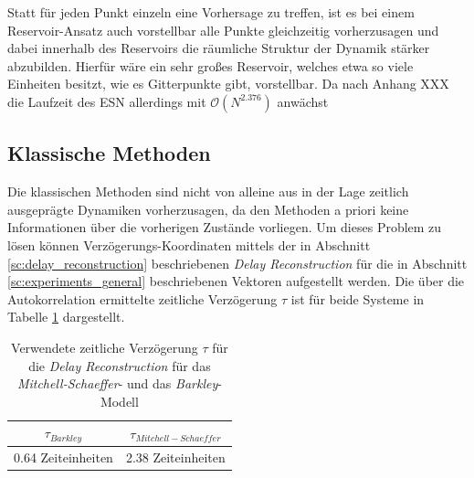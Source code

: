 Statt für jeden Punkt einzeln eine Vorhersage zu treffen, ist es bei einem Reservoir-Ansatz auch vorstellbar alle Punkte gleichzeitig vorherzusagen und dabei innerhalb des Reservoirs die räumliche Struktur der Dynamik stärker abzubilden. Hierfür wäre ein sehr großes Reservoir, welches etwa so viele Einheiten besitzt, wie es Gitterpunkte gibt, vorstellbar. Da nach Anhang XXX die Laufzeit des \textsc{ESN} allerdings mit $\mathcal{O}(N^{2.376})$ anwächst

\FloatBarrier
\subsection{Klassische Methoden}
Die klassischen Methoden sind nicht von alleine aus in der Lage zeitlich ausgeprägte Dynamiken vorherzusagen, da den Methoden a priori keine Informationen über die vorherigen Zustände vorliegen. Um dieses Problem zu lösen können Verzögerungs-Koordinaten mittels der in Abschnitt \ref{sc:delay_reconstruction} beschriebenen \textit{Delay Reconstruction} für die in Abschnitt \ref{sc:experiments_general} beschriebenen Vektoren aufgestellt werden. Die über die Autokorrelation ermittelte zeitliche Verzögerung $\tau$ ist für beide Systeme in Tabelle \ref{tab:delay_reconstruction_tau} dargestellt.     

\begin{table}[h]
\centering
\begin{tabular}{|c|c|}
$\tau_{Barkley}$ & $\tau_{Mitchell-Schaeffer}$ \\ 
\hline 
\hline 
0.64 Zeiteinheiten & 2.38 Zeiteinheiten\\ 
\hline 
\end{tabular} 
\caption{Verwendete zeitliche Verzögerung $\tau$ für die \textit{Delay Reconstruction} für das \textit{Mitchell-Schaeffer}- und das \textit{Barkley}-Modell}
\label{tab:delay_reconstruction_tau}
\end{table} 



